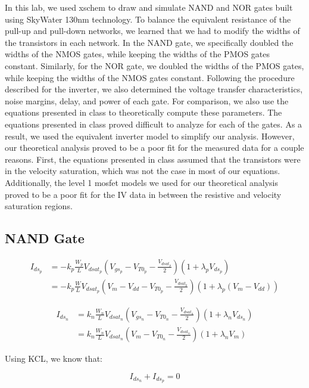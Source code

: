 \documentclass[fleqn]{article}
\begin{document}
	In this lab, we used xschem to draw and simulate NAND and NOR gates built using SkyWater 130nm technology. To balance the equivalent resistance of the pull-up and pull-down networks, we learned that we had to modify the widths of the transistors in each network. In the NAND gate, we specifically doubled the widths of the NMOS gates, while keeping the widths of the PMOS gates constant. Similarly, for the NOR gate, we doubled the widths of the PMOS gates, while keeping the widths of the NMOS gates constant. Following the procedure described for the inverter, we also determined the voltage transfer characteristics, noise margins, delay, and power of each gate. For comparison, we also use the equations presented in class to theoretically compute these parameters. The equations presented in class proved difficult to analyze for each of the gates. As a result, we used the equivalent inverter model to simplify our analysis. However, our theoretical analysis proved to be a poor fit for the measured data for a couple reasons. First, the equations presented in class assumed that the transistors were in the velocity saturation, which was not the case in most of our equations. Additionally, the level 1 mosfet models we used for our theoretical analysis proved to be a poor fit for the IV data in between the resistive and velocity saturation regions.
	
	\subsection{NAND Gate}

	\begin{align}
		I_{ds_p} &= -k_p\frac{W_p}{L}V_{dsat_p}\left(V_{gs_p} - V_{T0_p} - \frac{V_{dsat_p}}{2}\right)\left(1 + {\lambda_p}V_{ds_p}\right) \\
		&= -k_p\frac{W}{L}V_{dsat_p}\left(V_m - V_{dd} - V_{T0_p} - \frac{V_{dsat_p}}{2}\right)\left(1 + {\lambda_p}(V_m - V_{dd})\right)
	\end{align}
	
	\begin{align}
		I_{ds_n} &= k_n\frac{W_n}{L}V_{dsat_n}\left(V_{gs_n} - V_{T0_n} - \frac{V_{dsat_n}}{2}\right)\left(1 + {\lambda_n}V_{ds_n}\right) \\
		&= k_n\frac{W_n}{L}V_{dsat_n}\left(V_m - V_{T0_n} - \frac{V_{dsat_n}}{2}\right)\left(1 + {\lambda_n}V_m\right)
	\end{align}
	
	Using KCL, we know that:
	
	\begin{equation}
		I_{ds_n} + I_{ds_p} = 0
	\end{equation}
	
\end{document}
